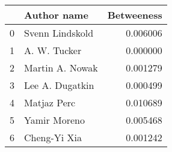 \begin{tabular}{llr}
\toprule
{} &      Author name &  Betweeness \\
\midrule
0 &  Svenn Lindskold &    0.006006 \\
1 &     A. W. Tucker &    0.000000 \\
2 &  Martin A. Nowak &    0.001279 \\
3 &  Lee A. Dugatkin &    0.000499 \\
4 &      Matjaz Perc &    0.010689 \\
5 &     Yamir Moreno &    0.005468 \\
6 &     Cheng-Yi Xia &    0.001242 \\
\bottomrule
\end{tabular}

